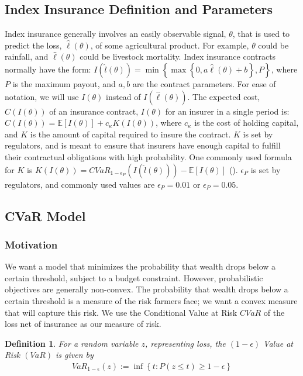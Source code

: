 \documentclass[11pt]{article}
\newtheorem{defn}[lemma]{Definition}
\begin{document}
  \subsection{Index Insurance Definition and Parameters}
    Index insurance generally involves an easily observable signal, $\theta$, that is used to predict the loss, $\hat{\ell}(\theta)$, of some agricultural product. For example, $\theta$ could be rainfall, and $\hat{\ell}(\theta)$ could be livestock mortality. Index insurance contracts normally have the form: $I(\hat{l}(\theta)) = \min \left \{\max \left \{0,a\hat{\ell}(\theta) + b \right \}, P \right \}$, where $P$ is the maximum payout, and $a,b$ are the contract parameters. For ease of notation, we will use $I(\theta)$ instead of $I(\hat{\ell}(\theta))$. The expected cost, $C(I(\theta))$ of an insurance contract, $I(\theta)$ for an insurer in a single period is: $C(I(\theta)) = \mathbb{E}[I(\theta)] + c_{\kappa} K(I(\theta))$, where $c_{\kappa}$ is the cost of holding capital, and $K$ is the amount of capital required to insure the contract. $K$ is set by regulators, and is meant to ensure that insurers have enough capital to fulfill their contractual obligations with high probability. One commonly used formula for $K$ is $K(I(\theta)) = CVaR_{1-\epsilon_P}\left ( I(\hat{l}(\theta)) \right ) - \mathbb{E}[I(\theta)]$ (\cite{mapfumo2017risk}). $\epsilon_P$ is set by regulators, and commonly used values are $\epsilon_P = 0.01$ or $\epsilon_P = 0.05$. 

  \subsection{CVaR Model}
  \subsubsection{Motivation}
    We want a model that minimizes the probability that wealth drops below a certain threshold, subject to a budget constraint. However, probabilistic objectives are generally non-convex. The probability that wealth drops below a certain threshold is a measure of the risk farmers face; we want a convex measure that will capture this risk. We use the Conditional Value at Risk $CVaR$ of the loss net of insurance as our measure of risk. 

  \begin{defn}
    For a random variable $z$, representing loss, the $(1-\epsilon)$ Value at Risk $(VaR)$ is given by 
    \begin{align*}
      VaR_{1-\epsilon}(z) := \inf \left \{ t : P(z \leq t) \geq 1-\epsilon \right \}
    \end{align*}
  \end{defn}
\end{document}
